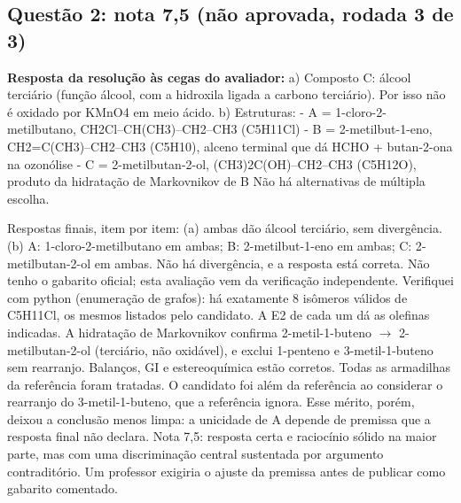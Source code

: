 \documentclass{article}%
\begin{document}
\subsection*{Questão 2: nota 7,5 (não aprovada, rodada 3 de 3)}%
\textbf{Resposta da resolução às cegas do avaliador:} a) Composto C: álcool terciário (função álcool, com a hidroxila ligada a carbono terciário). Por isso não é oxidado por KMnO4 em meio ácido.\newline%
\newline%
b) Estruturas:\newline%
{-} A = 1{-}cloro{-}2{-}metilbutano, CH2Cl--CH(CH3)--CH2--CH3 (C5H11Cl)\newline%
{-} B = 2{-}metilbut{-}1{-}eno, CH2=C(CH3)--CH2--CH3 (C5H10), alceno terminal que dá HCHO + butan{-}2{-}ona na ozonólise\newline%
{-} C = 2{-}metilbutan{-}2{-}ol, (CH3)2C(OH)--CH2--CH3 (C5H12O), produto da hidratação de Markovnikov de B\newline%
\newline%
Não há alternativas de múltipla escolha.\par %
Respostas finais, item por item: (a) ambas dão álcool terciário, sem divergência. (b) A: 1{-}cloro{-}2{-}metilbutano em ambas; B: 2{-}metilbut{-}1{-}eno em ambas; C: 2{-}metilbutan{-}2{-}ol em ambas. Não há divergência, e a resposta está correta. Não tenho o gabarito oficial; esta avaliação vem da verificação independente. Verifiquei com python (enumeração de grafos): há exatamente 8 isômeros válidos de C5H11Cl, os mesmos listados pelo candidato. A E2 de cada um dá as olefinas indicadas. A hidratação de Markovnikov confirma 2{-}metil{-}1{-}buteno $\to$ 2{-}metilbutan{-}2{-}ol (terciário, não oxidável), e exclui 1{-}penteno e 3{-}metil{-}1{-}buteno sem rearranjo. Balanços, GI e estereoquímica estão corretos. Todas as armadilhas da referência foram tratadas. O candidato foi além da referência ao considerar o rearranjo do 3{-}metil{-}1{-}buteno, que a referência ignora. Esse mérito, porém, deixou a conclusão menos limpa: a unicidade de A depende de premissa que a resposta final não declara. Nota 7,5: resposta certa e raciocínio sólido na maior parte, mas com uma discriminação central sustentada por argumento contraditório. Um professor exigiria o ajuste da premissa antes de publicar como gabarito comentado.%
\end{document}
